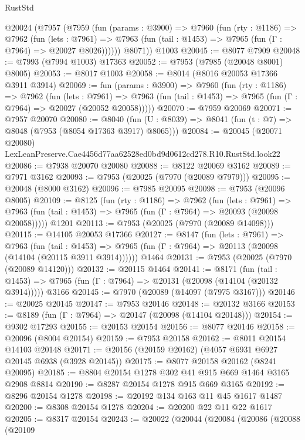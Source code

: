 \begin{lexlean}{RustStd}
\begin{coremodule}
    @20024
      (@7957
        (@7959
          (fun (params : @3900) =>
          @7960
            (fun (rty : @1186) =>
            @7962
              (fun (lets : @7961) =>
              @7963 (fun (tail : @1453) => @7965 (fun (Γ : @7964) => @20027 @8026))))))
        @8071))
    @1003
@20045 := @8077 @7909
@20048 := @7993 (@7994 @1003) @17363
@20052 := @7953 (@7985 (@20048 @8001) @8005)
@20053 := @8017 @1003
@20058 := @8014 (@8016 @20053 @17366 @3911 @3914)
@20069 := fun (params : @3900) =>
  @7960
    (fun (rty : @1186) =>
    @7962
      (fun (lets : @7961) =>
      @7963 (fun (tail : @1453) => @7965 (fun (Γ : @7964) => @20027 (@20052 @20058)))))
@20070 := @7959 @20069
@20071 := @7957 @20070
@20080 := @8040
    (fun (U : @8039) => @8041 (fun (t : @7) => @8048 (@7953 (@8054 @17363 @3917) @8065)))
@20084 := @20045
    (@20071 @20080)
    LexLeanPreserve.Cae4456d77aa62528ed0bd9d0612cd278.R10.RustStd.look22
@20086 := @7938 @20070 @20080
@20088 := @8122 @20069 @3162
@20089 := @7971 @3162
@20093 := @7953 (@20025 (@7970 (@20089 @7979)))
@20095 := @20048 (@8000 @3162)
@20096 := @7985 @20095
@20098 := @7953 (@20096 @8005)
@20109 := @8125
    (fun (rty : @1186) =>
    @7962
      (fun (lets : @7961) =>
      @7963 (fun (tail : @1453) => @7965 (fun (Γ : @7964) => @20093 (@20098 @20058)))))
    @1201
@20113 := @7953 (@20025 (@7970 (@20089 @14098)))
@20115 := @14105 @20053 @17366
@20127 := @8147
    (fun (lets : @7961) =>
    @7963
      (fun (tail : @1453) =>
      @7965 (fun (Γ : @7964) => @20113 (@20098 (@14104 (@20115 @3911 @3914))))))
    @1464
@20131 := @7953 (@20025 (@7970 (@20089 @14120)))
@20132 := @20115 @1464
@20141 := @8171
    (fun (tail : @1453) => @7965 (fun (Γ : @7964) => @20131 (@20098 (@14104 (@20132 @3914)))))
    @3166
@20145 := @7970 (@20089 (@14097 (@7975 @3167)))
@20146 := @20025 @20145
@20147 := @7953 @20146
@20148 := @20132 @3166
@20153 := @8189 (fun (Γ : @7964) => @20147 (@20098 (@14104 @20148)))
@20154 := @9302 @17293
@20155 := @20153 @20154
@20156 := @8077 @20146
@20158 := @20096 (@8004 @20154)
@20159 := @7953 @20158
@20162 := @8011 @20154 @14103 @20148
@20171 := @20156 (@20159 @20162) (@4057 @6931 @6927 @20145 @6938 (@3928 @20145))
@20175 := @8077 @20158 @20162 (@8241 @20095)
@20185 := @8804 @20154 @1278 @302 @41 @915 @669 @1464 @3165 @2908 @8814
@20190 := @8287 @20154 @1278 @915 @669 @3165
@20192 := @8296 @20154 @1278
@20198 := @20192 @134 @163 @11 @45 @1617 @1487
@20200 := @8308 @20154 @1278
@20204 := @20200 @22 @11 @22 @1617
@20205 := @8317 @20154
@20243 := @20022
    (@20044
      (@20084
        (@20086
          (@20088
            (@20109

\end{coremodule}
\end{lexlean}
